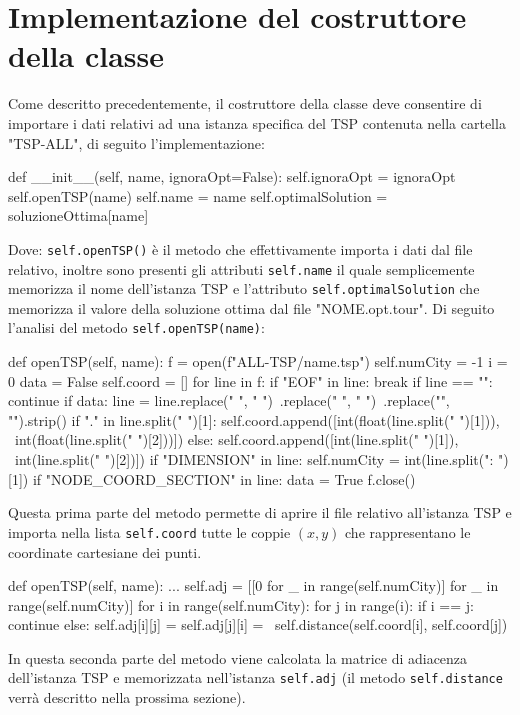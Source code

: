 \documentclass[a4paper,12pt]{report}
\begin{document}
\section{Implementazione del costruttore della classe}
Come descritto precedentemente, il costruttore della classe deve consentire di importare i dati relativi ad una istanza specifica del TSP contenuta nella cartella "TSP-ALL", di seguito l'implementazione:
\begin{python}
def __init__(self, name, ignoraOpt=False):
  self.ignoraOpt = ignoraOpt
  self.openTSP(name)
  self.name = name
  self.optimalSolution = soluzioneOttima[name]
\end{python}
Dove: \lstinline!self.openTSP()! è il metodo che effettivamente importa i dati dal file relativo, inoltre sono presenti gli attributi \lstinline!self.name! il quale semplicemente memorizza il nome dell'istanza TSP e l'attributo \lstinline!self.optimalSolution! che memorizza il valore della soluzione ottima dal file "NOME.opt.tour". \hfill \break
Di seguito l'analisi del metodo \lstinline!self.openTSP(name)!:
\begin{python}
def openTSP(self, name):
  f = open(f"ALL-TSP/{name}.tsp")
  self.numCity = -1
  i = 0
  data = False
  self.coord = []
  for line in f:
    if "EOF" in line:
      break
    if line == "":
      continue
    if data:
      line = line.replace("  ", " ")\
              .replace("  ", " ")\
              .replace("\n", "").strip()
      if "." in line.split(" ")[1]:
          self.coord.append([int(float(line.split(" ")[1])), \
                             int(float(line.split(" ")[2]))])
      else:
          self.coord.append([int(line.split(" ")[1]), \
                             int(line.split(" ")[2])])
    if "DIMENSION" in line:
      self.numCity = int(line.split(": ")[1])
    if "NODE_COORD_SECTION" in line:
      data = True
  f.close()
\end{python}
Questa prima parte del metodo permette di aprire il file relativo all'istanza TSP e importa nella lista \lstinline!self.coord! tutte le coppie $(x, y)$ che rappresentano le coordinate cartesiane dei punti.
\begin{python}
def openTSP(self, name):
  ...
  self.adj = [[0 for _ in range(self.numCity)] for _ in range(self.numCity)]
  for i in range(self.numCity):
    for j in range(i):
      if i == j:
        continue
      else:
        self.adj[i][j] = self.adj[j][i] = \
           self.distance(self.coord[i], self.coord[j])
\end{python}
In questa seconda parte del metodo viene calcolata la matrice di adiacenza dell'istanza TSP e memorizzata nell'istanza \lstinline!self.adj! (il metodo \lstinline!self.distance! verrà descritto nella prossima sezione).
\end{document}
